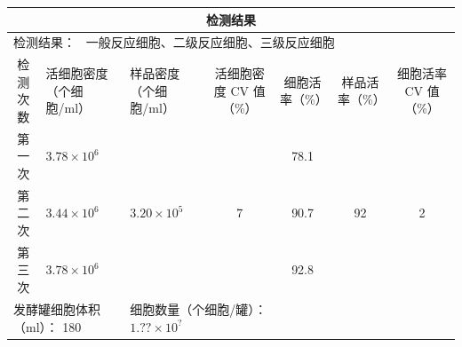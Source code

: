 \documentclass[UTF8,10pt,a4paper,fontset=fandol]{ctexart}
\newcommand{\fieldvalue}[1]{#1}
\newcommand{\handwritten}[1]{#1}
\begin{document}
\begin{center}
\begin{tabularx}{\textwidth}{|c|X|X|c|c|c|c|}
\hline
\multicolumn{7}{|c|}{检测结果} \\
\hline
\multicolumn{7}{|l|}{检测结果：
\fieldvalue{\handwritten{\checkmark}}\ 一般反应细胞、二级反应细胞、三级反应细胞} \\
\hline
检测次数 &
活细胞密度（个细胞/ml） &
样品密度（个细胞/ml） &
活细胞密度 CV 值（\%） &
细胞活率（\%） &
样品活率（\%） &
细胞活率 CV 值（\%） \\
\hline
第一次 &
\fieldvalue{\handwritten{$3.78\times10^{6}$}} &
&
&
\fieldvalue{\handwritten{78.1}} &
& \\
\hline
第二次 &
\fieldvalue{\handwritten{$3.44\times10^{6}$}} &
\fieldvalue{\handwritten{$3.20\times10^{5}$}} &
\fieldvalue{\handwritten{7}} &
\fieldvalue{\handwritten{90.7}} &
\fieldvalue{\handwritten{92}} &
\fieldvalue{\handwritten{2}} \\
\hline
第三次 &
\fieldvalue{\handwritten{$3.78\times10^{6}$}} &
&
&
\fieldvalue{\handwritten{92.8}} &
& \\
\hline
\multicolumn{2}{|l|}{发酵罐细胞体积（ml）：
\fieldvalue{\handwritten{180}}}
&
\multicolumn{2}{l|}{细胞数量（个细胞/罐）：
$\fieldvalue{\handwritten{1.??\times10^{?}}}$}
& \multicolumn{3}{l|}{} \\
\hline
\end{tabularx}
\end{center}
\end{document}
